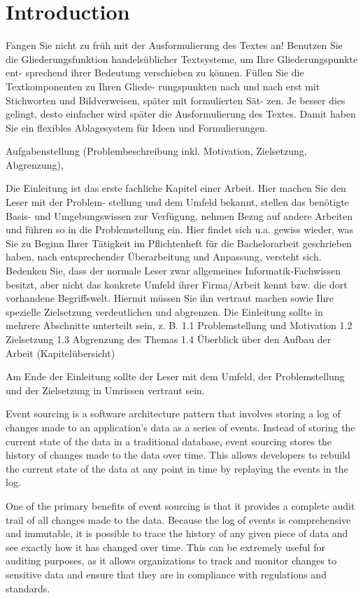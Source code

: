 %
\chapter{Introduction}

Fangen Sie nicht zu früh mit der Ausformulierung des Textes an!
Benutzen Sie die Gliederungsfunktion handelsüblicher Textsysteme, um Ihre Gliederungspunkte ent- sprechend ihrer Bedeutung verschieben zu können. Füllen Sie die Textkomponenten zu Ihren Gliede- rungspunkten nach und nach erst mit Stichworten und Bildverweisen, später mit formulierten Sät- zen. Je besser dies gelingt, desto einfacher wird später die Ausformulierung des Textes. Damit haben Sie ein flexibles Ablagesystem für Ideen und Formulierungen.

Aufgabenstellung (Problembeschreibung inkl. Motivation, Zielsetzung, Abgrenzung),

Die Einleitung ist das erste fachliche Kapitel einer Arbeit. Hier machen Sie den Leser mit der Problem- stellung und dem Umfeld bekannt, stellen das benötigte Basis- und Umgebungswissen zur Verfügung, nehmen Bezug auf andere Arbeiten und führen so in die Problemstellung ein. Hier findet sich u.a. gewiss wieder, was Sie zu Beginn Ihrer Tätigkeit im Pflichtenheft für die Bachelorarbeit geschrieben haben, nach entsprechender Überarbeitung und Anpassung, versteht sich. Bedenken Sie, dass der normale Leser zwar allgemeines Informatik-Fachwissen besitzt, aber nicht das konkrete Umfeld ihrer Firma/Arbeit kennt bzw. die dort vorhandene Begriffswelt. Hiermit müssen Sie ihn vertraut machen sowie Ihre spezielle Zielsetzung verdeutlichen und abgrenzen.
Die Einleitung sollte in mehrere Abschnitte unterteilt sein, z. B. 1.1 Problemstellung und Motivation
1.2 Zielsetzung
1.3 Abgrenzung des Themas
1.4 Überblick über den Aufbau der Arbeit (Kapitelübersicht)

Am Ende der Einleitung sollte der Leser mit dem Umfeld, der Problemstellung und der Zielsetzung in Umrissen vertraut sein.

Event sourcing is a software architecture pattern that involves storing a log of changes made to an application's data as a series of events. Instead of storing the current state of the data in a traditional database, event sourcing stores the history of changes made to the data over time. This allows developers to rebuild the current state of the data at any point in time by replaying the events in the log.

One of the primary benefits of event sourcing is that it provides a complete audit trail of all changes made to the data. Because the log of events is comprehensive and immutable, it is possible to trace the history of any given piece of data and see exactly how it has changed over time. This can be extremely useful for auditing purposes, as it allows organizations to track and monitor changes to sensitive data and ensure that they are in compliance with regulations and standards.

